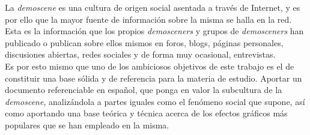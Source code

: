 La \emph{demoscene} es una cultura de origen social asentada a través de Internet, y es por ello que la mayor fuente de información sobre la misma se halla en la red. Esta es la información que los propios \emph{demosceners} y grupos de \emph{demosceners} han publicado o publican sobre ellos mismos en foros, blogs, páginas personales, discusiones abiertas, redes sociales y de forma muy ocasional, entrevistas.\\

Es por esto mismo que uno de los ambiciosos objetivos de este trabajo es el de constituir una base sólida y de referencia para la materia de estudio. Aportar un documento referenciable en español, que ponga en valor la subcultura de la \emph{demoscene}, analizándola a partes iguales como el fenómeno social que supone, así como aportando una base teórica y técnica acerca de los efectos gráficos más populares que se han empleado en la misma.